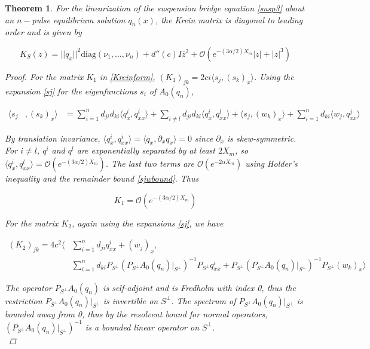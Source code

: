 \documentclass[12pt]{article}
\newtheorem{theorem}{Theorem}
\begin{document}
\begin{theorem}\label{Kreindiagdom}
For the linearization of the suspension bridge equation \eqref{susp3} about an $n-$pulse equilibrium solution $q_n(x)$, the Krein matrix is diagonal to leading order and is given by

\begin{equation}\label{Kreinapprox}
K_S(z) = ||q_x||^2 \text{diag} (\nu_1, \dots, \nu_n)
 + d''(c) I \overline{z}^2 + \mathcal{O}(e^{-(3 \alpha/2) X_m}|z| + |z|^3)
\end{equation}

\begin{proof}
For the matrix $K_1$ in \eqref{Kreinform}, $(K_1)_{jk} = 2 c i \langle s_j, (s_k)_x \rangle$. Using the expansion \eqref{sj} for the eigenfunctions $s_i$ of $A_0(q_n)$,

\begin{align}
\langle s_j &, (s_k)_x \rangle 
&= \sum_{i = 1}^{n} d_{ji} d_{ki} \langle q^i_x, q^i_{xx} \rangle 
+ \sum_{i \neq l} d_{ji} d_{kl} \langle q^i_x, q^l_{xx} \rangle 
+ \langle s_j, (w_k)_x \rangle 
+ \sum_{i = 1}^{n} d_{ki} \langle w_j, q^j_{xx} \rangle
\end{align}  

By translation invariance, $\langle q^i_x, q^i_{xx} \rangle = \langle q_x, \partial_x q_x \rangle = 0$ since $\partial_x$ is skew-symmetric. For $i \neq l$, $q^i$ and $q^l$ are exponentially separated by at least $2 X_m$, so $\langle q^i_x, q^l_{xx} \rangle = \mathcal{O}(e^{-(3 \alpha/2) X_m})$. The last two terms are $\mathcal{O}(e^{-2 \alpha X_m})$ using Holder's inequality and the remainder bound \eqref{sjwbound}. Thus 

\begin{equation}\label{K1final}
K_1 = \mathcal{O}(e^{-(3 \alpha/2) X_m})
\end{equation}

For the matrix $K_2$, again using the expansions \eqref{sj}, we have

\begin{align}\label{K2expansion}
(K_2)_{jk} 
= 4 c^2 \langle &\sum_{i = 1}^{n} d_{ji} q^i_{xx} + (w_j)_x, \\
&\sum_{i = 1}^{n} d_{ki} P_{S^\perp} (P_{S^\perp} A_0(q_n)|_{S^\perp})^{-1} P_{S^\perp} q^i_{xx} + P_{S^\perp} (P_{S^\perp} A_0(q_n)|_{S^\perp})^{-1} P_{S^\perp} (w_k)_x \rangle \nonumber 
\end{align}

The operator $P_{S^\perp} A_0(q_n)$ is self-adjoint and is Fredholm with index 0, thus the restriction $P_{S^\perp} A_0(q_n)|_{S^\perp}$ is invertible on $S^\perp$. The spectrum of $P_{S^\perp} A_0(q_n)|_{S^\perp}$ is bounded away from 0, thus by the resolvent bound for normal operators, $(P_{S^\perp} A_0(q_n)|_{S^\perp})^{-1}$ is a bounded linear operator on $S^\perp$. \\


\end{proof}
\end{theorem}
\end{document}
